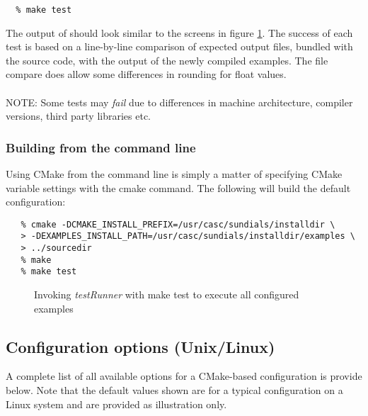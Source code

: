 \begin{verbatim}
  % make test
\end{verbatim}
The output of  should look similar to the screens in figure
\ref{f:testrunner}. The success of each test is based on a line-by-line comparison of expected output files, bundled with the source code, with
the output of the newly compiled examples. The file compare does allow some differences in rounding for float values.\\\\
NOTE: Some tests may {\em fail} due to differences in machine architecture, compiler versions, third party libraries etc.{\warn}
 

\subsubsection*{Building from the command line}

Using CMake from the command line is simply a matter of specifying CMake variable settings
with the {\id cmake} command.  The following will build the default configuration:  

\begin{verbatim}
   % cmake -DCMAKE_INSTALL_PREFIX=/usr/casc/sundials/installdir \
   > -DEXAMPLES_INSTALL_PATH=/usr/casc/sundials/installdir/examples \
   > ../sourcedir
   % make
   % make test
\end{verbatim}

\begin{figure}[!ht]
{\centerline{}}
\vspace{3 mm}
{\centerline{}}
\caption [Running {\em testRunner}]
{Invoking {\em testRunner} with {\id make test} to execute all configured
{\id examples} }
\label{f:testrunner}
\end{figure}


\subsection{Configuration options (Unix/Linux)}\label{ss:configuration_options_nix}

A complete list of all available options for a CMake-based {\sundials}
configuration is provide below. Note that the default values shown are for 
a typical configuration on a Linux system and are provided as illustration only.


